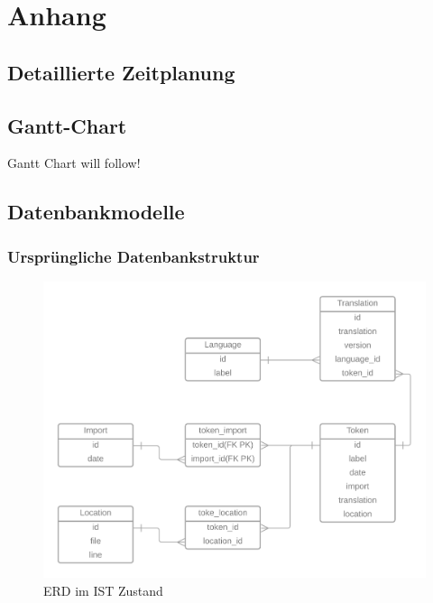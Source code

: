 \documentclass[10pt, oneside]{article}
\begin{document}
  \section{Anhang}
  \subsection{Detaillierte Zeitplanung}\label{sec:detailTime}
  \subsection{Gantt-Chart}\label{sec:GanttChart}
    Gantt Chart will follow!
    \newpage
  \subsection{Datenbankmodelle}
  \subsubsection{Ursprüngliche Datenbankstruktur}\label{sec:isErd}
  \begin{figure}[ht]
    \centering
    \includegraphics[width=\textwidth]{ERD_TranslationService_IST-Analyse.png}
    \caption{ERD im IST Zustand}
  \end{figure}
\end{document}
